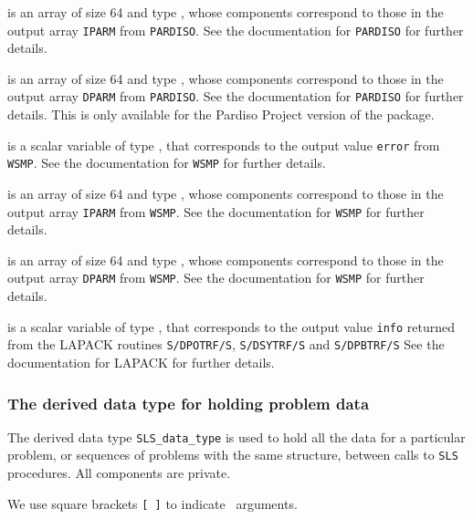 \documentclass{galahad}
\newcommand{\packagename}{SLS}
\begin{document}
\begin{description}
 is an array of size 64 and type \integer,
whose components correspond to those in the output array {\tt IPARM}
from {\tt PARDISO}. See the documentation for {\tt PARDISO} for further
details.

 is an array of size 64 and type \realdp,
whose components correspond to those in the output array {\tt DPARM}
from {\tt PARDISO}. See the documentation for {\tt PARDISO} for further
details. This is only available for the Pardiso Project version of the package.

 is a scalar variable of type \integer,
that corresponds to the output value {\tt error}
from {\tt WSMP}. See the documentation for {\tt WSMP} for further
details.

 is an array of size 64 and type \integer,
whose components correspond to those in the output array {\tt IPARM}
from {\tt WSMP}. See the documentation for {\tt WSMP} for further
details.

 is an array of size 64 and type \realdp,
whose components correspond to those in the output array {\tt DPARM}
from {\tt WSMP}. See the documentation for {\tt WSMP} for further
details.

 is a scalar variable of type \integer,
that corresponds to the output value {\tt info} returned from
the LAPACK routines {\tt S/DPOTRF/S},
{\tt S/DSYTRF/S} and {\tt S/DPBTRF/S}
See the documentation for LAPACK for further
details.

\end{description}



\subsubsection{The derived data type for holding problem data}\label{typedata}
The derived data type
{\tt \packagename\_data\_type}
is used to hold all the data for a particular problem,
or sequences of problems with the same structure, between calls to
{\tt \packagename} procedures.
All components are private.


\galarguments
We use square brackets {\tt [ ]} to indicate \optional\ arguments.
\end{document}
